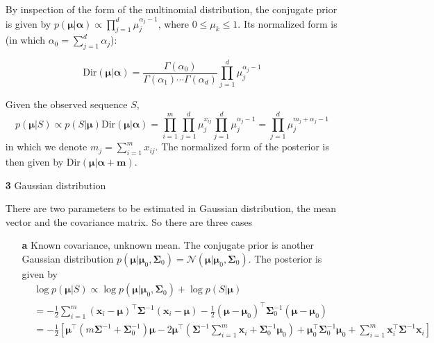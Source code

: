 \documentclass{article}
\begin{document}
\begin{itemize}
	By inspection of the form of the multinomial distribution, the conjugate prior is given by $p(\bm{\mu}|\bm{\alpha})\propto \prod_{j=1}^d \mu_j^{\alpha_j-1}$, where $0\leq\mu_k\leq 1$. Its normalized form is (in which $\alpha_0=\sum_{j=1}^d \alpha_j$):
	
	\begin{equation*}
	\mathrm{Dir} (\bm{\mu}|\bm{\alpha}) = \frac{\Gamma(\alpha_0)}{\Gamma(\alpha_1)\cdots\Gamma(\alpha_d)}  \prod_{j=1}^d \mu_j^{\alpha_j-1}
	\end{equation*}
	
	Given the observed sequence $S$, 
	\begin{equation*}
	p(\bm{\mu}|S) \propto p(S|\bm{\mu}) \mathrm{Dir} (\bm{\mu}|\bm{\alpha}) =\prod_{i=1}^m \prod_{j=1}^d \mu_j^{x_{ij}} \prod_{j=1}^d \mu_j^{\alpha_j-1} =  \prod_{j=1}^d \mu_j^{m_j+\alpha_j-1}
	\end{equation*}
in which we denote $m_j=\sum_{i=1}^m x_{ij}$. The normalized form of the posterior is then given by $\mathrm{Dir}(\bm{\mu}|\bm{\alpha}+\bm{m})$.
	
	\item [\textbf{3}] Gaussian distribution

	There are two parameters to be estimated in Gaussian distribution, the mean vector and the covariance matrix. So there are three cases
	
	\begin{itemize}
	\item [\textbf{a}] Known covariance, unknown mean.
	The conjugate prior is another Gaussian distribution $p(\bm{\mu}|\bm{\mu}_0, \bm{\Sigma}_0)=\mathcal{N}(\bm{\mu}|\bm{\mu}_0, \bm{\Sigma}_0)$. The posterior is given by
	\begin{equation*}
	\begin{split}
	& \log p(\bm{\mu}|S) \propto \log p(\bm{\mu}|\bm{\mu}_0, \bm{\Sigma}_0) + \log p(S|\bm{\mu}) \\
	&= -\frac{1}{2} \sum_{i=1}^m  (\bm{x}_i-\bm{\mu})^\top \bm{\Sigma}^{-1}  (\bm{x}_i-\bm{\mu}) -\frac{1}{2}(\bm{\mu}-\bm{\mu}_0)^\top \bm{\Sigma}_0^{-1} (\bm{\mu}-\bm{\mu}_0) \\
	&= -\frac{1}{2} \left[ \bm{\mu}^\top (m\bm{\Sigma}^{-1} + \bm{\Sigma}_0^{-1}) \bm{\mu} - 2 \bm{\mu}^\top \left(\bm{\Sigma}^{-1} \sum_{i=1}^m \bm{x}_i + \bm{\Sigma}_0^{-1} \bm{\mu}_0\right) + \bm{\mu}_0^\top \bm{\Sigma}_0^{-1} \bm{\mu}_0 + \sum_{i=1}^m \bm{x}_i^\top \bm{\Sigma}^{-1} \bm{x}_i\right]
	\end{split}
	\end{equation*}
	

\end{itemize}
\end{itemize}
\end{document}
